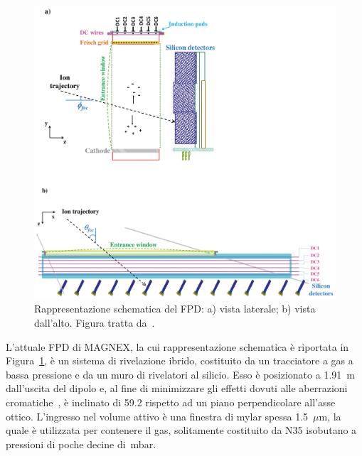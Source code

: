 

\subsection{} \label{sez:fpd}

\begin{figure} [!p]
	\centering
	\includegraphics[width=\textwidth, keepaspectratio]{Grafici/fpd.png}
	\caption{Rappresentazione schematica del FPD: a) vista laterale; b) vista dall'alto. Figura tratta da~\cite{cappuzzello:epja18}.} \label{fig:fpd}
\end{figure}


L'attuale FPD di MAGNEX, la cui rappresentazione schematica è riportata in Figura~\ref{fig:fpd}, è un sistema di rivelazione ibrido, costituito da un tracciatore a gas a bassa pressione e da un muro di rivelatori al silicio.
Esso è posizionato a 1.91~m dall'uscita del dipolo e, al fine di minimizzare gli effetti dovuti alle aberrazioni cromatiche~\cite{cunsolo:nima01}, è inclinato di 59.2\textdegree{} rispetto ad un piano perpendicolare all'asse ottico.
L'ingresso nel volume attivo è una finestra di mylar spessa 1.5~$\mu$m, la quale è utilizzata per contenere il gas, solitamente costituito da N35 isobutano a pressioni di poche decine di~mbar.



